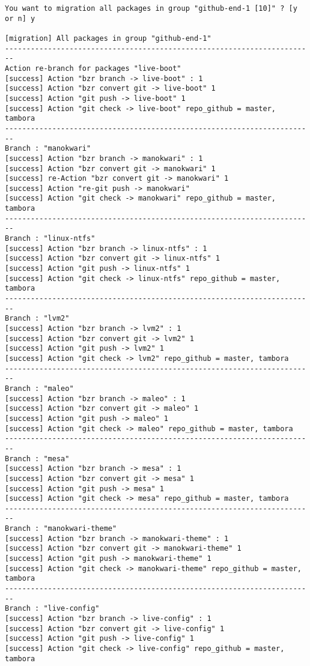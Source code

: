 {\begin{lstlisting}[language=ShellBash2]
You want to migration all packages in group "github-end-1 [10]" ? [y or n] y

[migration] All packages in group "github-end-1" 
------------------------------------------------------------------------
Action re-branch for packages "live-boot" 
[success] Action "bzr branch -> live-boot" : 1
[success] Action "bzr convert git -> live-boot" 1
[success] Action "git push -> live-boot" 1
[success] Action "git check -> live-boot" repo_github = master, tambora
------------------------------------------------------------------------
Branch : "manokwari"
[success] Action "bzr branch -> manokwari" : 1
[success] Action "bzr convert git -> manokwari" 1
[success] re-Action "bzr convert git -> manokwari" 1
[success] Action "re-git push -> manokwari" 
[success] Action "git check -> manokwari" repo_github = master, tambora
------------------------------------------------------------------------
Branch : "linux-ntfs"
[success] Action "bzr branch -> linux-ntfs" : 1
[success] Action "bzr convert git -> linux-ntfs" 1
[success] Action "git push -> linux-ntfs" 1
[success] Action "git check -> linux-ntfs" repo_github = master, tambora
------------------------------------------------------------------------
Branch : "lvm2"
[success] Action "bzr branch -> lvm2" : 1
[success] Action "bzr convert git -> lvm2" 1
[success] Action "git push -> lvm2" 1
[success] Action "git check -> lvm2" repo_github = master, tambora
------------------------------------------------------------------------
Branch : "maleo"
[success] Action "bzr branch -> maleo" : 1
[success] Action "bzr convert git -> maleo" 1
[success] Action "git push -> maleo" 1
[success] Action "git check -> maleo" repo_github = master, tambora
------------------------------------------------------------------------
Branch : "mesa"
[success] Action "bzr branch -> mesa" : 1
[success] Action "bzr convert git -> mesa" 1
[success] Action "git push -> mesa" 1
[success] Action "git check -> mesa" repo_github = master, tambora
------------------------------------------------------------------------
Branch : "manokwari-theme"
[success] Action "bzr branch -> manokwari-theme" : 1
[success] Action "bzr convert git -> manokwari-theme" 1
[success] Action "git push -> manokwari-theme" 1
[success] Action "git check -> manokwari-theme" repo_github = master, tambora
------------------------------------------------------------------------
Branch : "live-config"
[success] Action "bzr branch -> live-config" : 1
[success] Action "bzr convert git -> live-config" 1
[success] Action "git push -> live-config" 1
[success] Action "git check -> live-config" repo_github = master, tambora

\end{lstlisting}}
